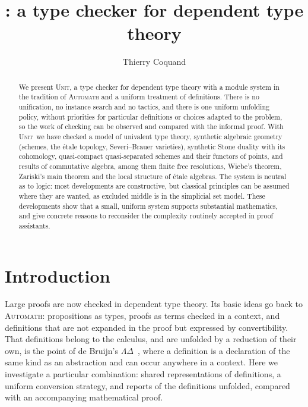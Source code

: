 \documentclass[11pt]{article}
\title{\sys: a type checker for dependent type theory}
\author{Thierry Coquand}
\date{}
\newcommand{\sys}{\textsc{Unit}}
\begin{document}
\maketitle

\begin{abstract}
We present \sys, a type checker for dependent type theory with a module
system in the tradition of \textsc{Automath} and a uniform treatment of
definitions. There is no unification, no instance search and no
tactics, and there is one uniform unfolding policy, without priorities
for particular definitions or choices adapted to the problem, so the
work of checking can be observed and compared with the informal proof. With \sys\ we have
checked a model of univalent type theory, synthetic algebraic geometry
(schemes, the \'etale topology, Severi--Brauer varieties), synthetic Stone duality with its
cohomology, quasi-compact quasi-separated schemes and their functors of
points, and results of commutative algebra, among them
finite free resolutions, Wiebe's theorem, Zariski's main theorem and the
local structure of \'etale algebras. The system is neutral as to logic:
most developments are constructive, but classical principles can be
assumed where they are wanted, as excluded middle is in the simplicial
set model. These developments show that a small, uniform system
supports substantial mathematics, and give concrete reasons to
reconsider the complexity routinely accepted in proof assistants.
\end{abstract}

\section{Introduction}

Large proofs are now checked in dependent type theory. Its basic ideas
go back to \textsc{Automath}: propositions as types,
proofs as terms checked in a context, and definitions that are not
expanded in the proof but expressed by convertibility. That definitions
belong to the calculus, and are unfolded by a reduction of their own, is
the point of de Bruijn's $\Lambda\Delta$~\cite{LD}, where a definition is
a declaration of the same kind as an abstraction and can occur anywhere
in a context. Here we investigate a particular combination: shared
representations of definitions, a uniform conversion strategy, and
reports of the definitions unfolded, compared with an accompanying
mathematical proof.
\end{document}
